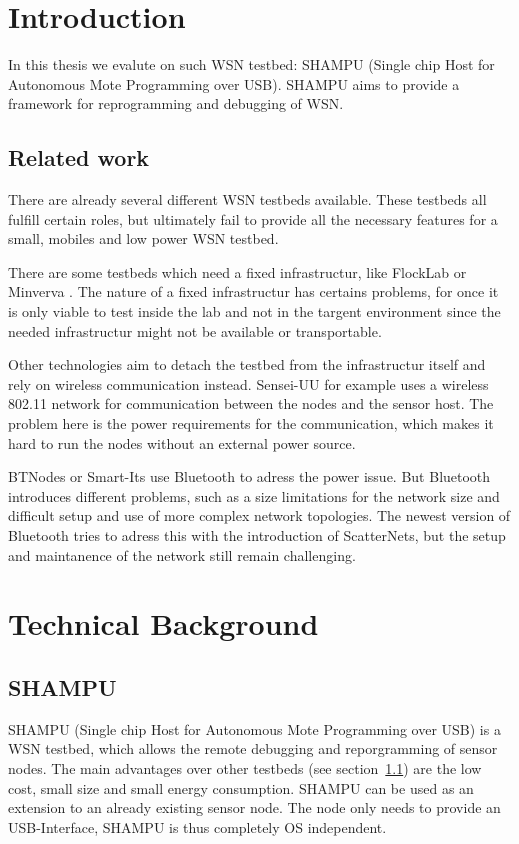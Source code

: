 \chapter{Introduction}
In this thesis we evalute on such WSN testbed: SHAMPU (Single chip Host for Autonomous Mote Programming over USB). SHAMPU aims to provide a framework for reprogramming and debugging of WSN. 


\section{Related work}
\label{sec:related_work}

There are already several different WSN testbeds available. These testbeds all fulfill certain roles, but ultimately fail to provide all the necessary features for a small, mobiles and low power WSN testbed.

There are some testbeds which need a fixed infrastructur, like FlockLab \cite{Lim2013} or Minverva \cite{Sommer}. The nature of a fixed infrastructur has certains problems, for once it is only viable to test inside the lab and not in the targent environment since the needed infrastructur might not be available or transportable. 

Other technologies aim to detach the testbed from the infrastructur itself and rely on wireless communication instead. Sensei-UU \cite{Rensfelt2009} for example uses a wireless 802.11 network for communication between the nodes and the sensor host. The problem here is the power requirements for the communication, which makes it hard to run the nodes without an external power source.

BTNodes \cite{Moser} or Smart-Its \cite{Kasten2000} use Bluetooth to adress the power issue. But Bluetooth introduces different problems, such as a size limitations for the network size and difficult setup and use of more complex network topologies. The newest version of Bluetooth tries to adress this with the introduction of ScatterNets, but the setup and maintanence of the network still remain challenging.

\chapter{Technical Background}
\section{SHAMPU}

SHAMPU (Single chip Host for Autonomous Mote Programming over USB) \cite{Smeets:2014:DAL:2602339.2602401} is a WSN testbed, which allows the remote debugging and reporgramming of sensor nodes. The main advantages over other testbeds (see section~\ref{sec:related_work}) are the low cost, small size and small energy consumption. SHAMPU can be used as an extension to an already existing sensor node. The node only needs to provide an USB-Interface, SHAMPU is thus completely OS independent.\\

